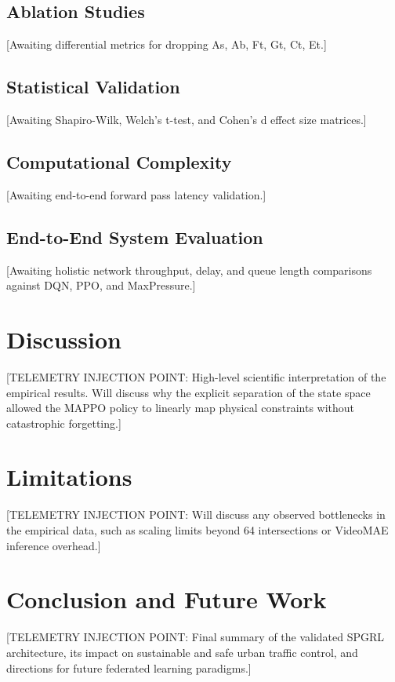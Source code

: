 \documentclass[journal]{IEEEtran}
\begin{document}
\subsection{Ablation Studies}
[Awaiting differential metrics for dropping As, Ab, Ft, Gt, Ct, Et.]

\subsection{Statistical Validation}
[Awaiting Shapiro-Wilk, Welch's t-test, and Cohen's d effect size matrices.]

\subsection{Computational Complexity}
[Awaiting end-to-end forward pass latency validation.]

\subsection{End-to-End System Evaluation}
[Awaiting holistic network throughput, delay, and queue length comparisons against DQN, PPO, and MaxPressure.]

\section{Discussion}
\label{sec:discussion}
[TELEMETRY INJECTION POINT: High-level scientific interpretation of the empirical results. Will discuss why the explicit separation of the state space allowed the MAPPO policy to linearly map physical constraints without catastrophic forgetting.]

\section{Limitations}
\label{sec:limitations}
[TELEMETRY INJECTION POINT: Will discuss any observed bottlenecks in the empirical data, such as scaling limits beyond 64 intersections or VideoMAE inference overhead.]

\section{Conclusion and Future Work}
\label{sec:conclusion}
[TELEMETRY INJECTION POINT: Final summary of the validated SPGRL architecture, its impact on sustainable and safe urban traffic control, and directions for future federated learning paradigms.]
\end{document}
